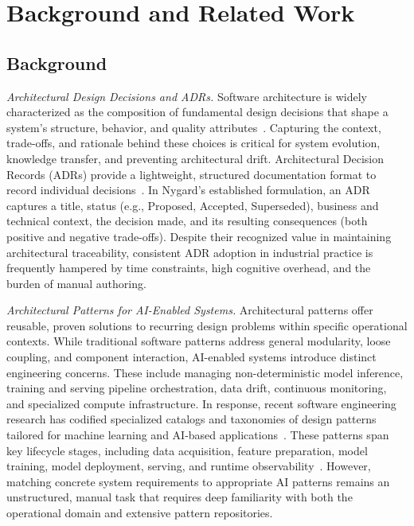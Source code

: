 \section{Background and Related Work}
\label{sec:background-related-work}

\subsection{Background}
\label{sec:background}

\emph{Architectural Design Decisions and ADRs.}
Software architecture is widely characterized as the composition of fundamental
design decisions that shape a system's structure, behavior, and quality
attributes~\cite{jansen2005decisions,kruchten2006architectural}.
Capturing the context, trade-offs, and rationale behind these choices is critical
for system evolution, knowledge transfer, and preventing architectural drift.
Architectural Decision Records (ADRs) provide a lightweight, structured
documentation format to record individual decisions~\cite{nygard2011adr}.
In Nygard's established formulation, an ADR captures a title, status (e.g.,
Proposed, Accepted, Superseded), business and technical context, the decision
made, and its resulting consequences (both positive and negative trade-offs).
Despite their recognized value in maintaining architectural traceability,
consistent ADR adoption in industrial practice is frequently hampered by time
constraints, high cognitive overhead, and the burden of manual authoring.

\emph{Architectural Patterns for AI-Enabled Systems.}
Architectural patterns offer reusable, proven solutions to recurring design
problems within specific operational contexts. While traditional software
patterns address general modularity, loose coupling, and component
interaction, AI-enabled systems introduce distinct engineering concerns.
These include managing non-deterministic model inference, training and
serving pipeline orchestration, data drift, continuous monitoring, and
specialized compute infrastructure.
In response, recent software engineering research has codified specialized
catalogs and taxonomies of design patterns tailored for machine learning and
AI-based applications~\cite{washizaki2019patterns,heiland2023patterns}.
These patterns span key lifecycle stages, including data acquisition,
feature preparation, model training, model deployment, serving, and runtime
observability~\cite{aiPatternsRepository}.
However, matching concrete system requirements to appropriate AI patterns
remains an unstructured, manual task that requires deep familiarity with both
the operational domain and extensive pattern repositories.

